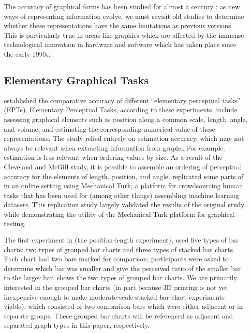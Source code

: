 \documentclass[letterpaper,inpress,dvipsnames]{jdsart}
\begin{document}
The accuracy of graphical forms has been studied for almost a century \citep{vonhuhnFurtherStudiesGraphic1927, eellsRelativeMeritsCircles1926, croxtonGraphicComparisonsBars1932, croxtonBarChartsCircle1927}; as new ways of representing information evolve, we must revisit old studies to determine whether these representations have the same limitations as previous versions. This is particularly true in areas like graphics which are affected by the immense technological innovation in hardware and software which has taken place since the early 1990s.

\hypertarget{elementary-graphical-tasks}{%
\subsection{Elementary Graphical Tasks}\label{elementary-graphical-tasks}}

\citet{clevelandGraphical1984} established the comparative accuracy of different ``elementary perceptual tasks'' (EPTs).
Elementary Perceptual Tasks, according to these experiments, include assessing graphical elements such as position along a common scale, length, angle, and volume, and estimating the corresponding numerical value of these representations.
The study relied entirely on estimation accuracy, which may not always be relevant when extracting information from graphs. For example, estimation is less relevant when ordering values by size.
As a result of the Cleveland and McGill \citeyearpar{clevelandGraphical1984} study, it is possible to assemble an ordering of perceptual accuracy for the elements of length, position, and angle.
\citet{heerCrowdsourcingGraphicalPerception2010b} replicated some parts of \citet{clevelandGraphical1984} in an online setting using Mechanical Turk, a platform for crowdsourcing human tasks that has been used for (among other things) assembling machine learning datasets. This replication study largely validated the results of the original study while demonstrating the utility of the Mechanical Turk platform for graphical testing.

The first experiment in \citet{clevelandGraphical1984} (the position-length experiment), used five types of bar charts: two types of grouped bar charts and three types of stacked bar charts.
Each chart had two bars marked for comparison; participants were asked to determine which bar was smaller and give the perceived ratio of the smaller bar to the larger bar.  shows the two types of grouped bar charts.
We are primarily interested in the grouped bar charts (in part because 3D printing is not yet inexpensive enough to make moderate-scale stacked bar chart experiments viable), which consisted of two comparison bars which were either adjacent or in separate groups.
These grouped bar charts will be referenced as adjacent and separated graph types in this paper, respectively.
\end{document}

